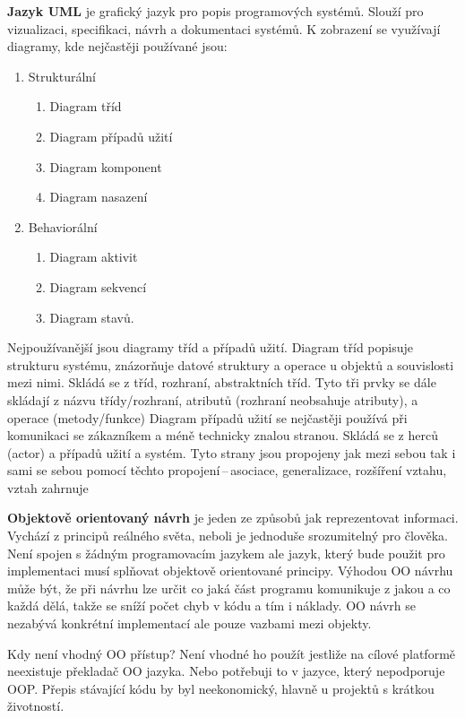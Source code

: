  \textbf{Jazyk UML} je grafický jazyk pro popis programových systémů. Slouží pro vizualizaci, specifikaci, návrh a dokumentaci systémů. K zobrazení se využívají diagramy, kde nejčastěji používané jsou:
\begin{enumerate}
    \item Strukturální
    \begin{enumerate}
        \item Diagram tříd
        \item Diagram případů užití
        \item Diagram komponent
        \item Diagram nasazení
    \end{enumerate}
    \item Behaviorální
    \begin{enumerate}
        \item Diagram aktivit
        \item Diagram sekvencí
        \item Diagram stavů.
    \end{enumerate}
\end{enumerate}
Nejpoužívanější jsou diagramy tříd a případů užití. Diagram tříd popisuje strukturu systému, znázorňuje datové struktury a operace u objektů a souvislosti mezi nimi. Skládá se z tříd, rozhraní, abstraktních tříd. Tyto tři prvky se dále skládají z názvu třídy/rozhraní, atributů (rozhraní neobsahuje atributy), a operace (metody/funkce) Diagram případů užití se nejčastěji používá při komunikaci se zákazníkem a méně technicky znalou stranou. Skládá se z herců (actor) a případů užití a systém. Tyto strany jsou propojeny jak mezi sebou tak i sami se sebou pomocí těchto propojení\,--\,asociace, generalizace, rozšíření vztahu, vztah zahrnuje

\textbf{Objektově orientovaný návrh} je jeden ze způsobů jak reprezentovat informaci. Vychází z principů reálného světa, neboli je jednoduše srozumitelný pro člověka. Není spojen s žádným programovacím jazykem ale jazyk, který bude použit pro implementaci musí splňovat objektově orientované principy. Výhodou OO návrhu může být, že při návrhu lze určit co jaká část programu komunikuje z jakou a co každá dělá, takže se sníží počet chyb v kódu a tím i náklady. OO návrh se nezabývá konkrétní implementací ale pouze vazbami mezi objekty.

Kdy není vhodný OO přístup? Není vhodné ho použít jestliže na cílové platformě neexistuje překladač OO jazyka. Nebo potřebuji to v jazyce, který nepodporuje OOP. Přepis stávající kódu by byl neekonomický, hlavně u projektů s krátkou životností.

